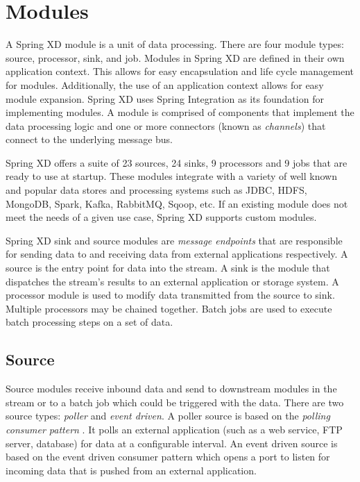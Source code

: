 \section{Modules}
\label{sec:Modules}
A Spring XD module is a unit of data processing. There are four module
types: source, processor, sink, and job. Modules in Spring XD are defined
in their own application context. This allows for easy encapsulation and life cycle
management for modules. Additionally, the use of an application context allows for easy
module expansion.  Spring XD uses Spring Integration as its foundation for
implementing modules. A module is comprised of components that
implement the data processing logic and one or more connectors (known as \emph{channels})
that connect to the underlying message bus.

\par

Spring XD offers a suite of 23 sources, 24 sinks, 9 processors and 9 jobs that are ready
to use at startup.  These modules integrate with a variety of well known and popular
data stores and processing systems such as JDBC\cite{jdbc}, HDFS, MongoDB\cite{mongodb},
Spark, Kafka, RabbitMQ, Sqoop, etc.  If an existing module does not meet the needs of a
given use case, Spring XD supports custom modules.

Spring XD sink and source modules are \emph{message endpoints}
\cite{enterprise-integration-pattern-message-endpoint}
that are responsible for sending data to and receiving data from external applications
respectively. A source is the entry point for data into the stream. A sink is
the module that dispatches the stream's results to an external application or storage system.
A processor module is used to modify data transmitted from the source to sink.
Multiple processors may be chained together. Batch jobs are used to execute batch
processing steps on a set of data.

\par

\subsection{Source}
\label{sec:Source}
Source modules receive inbound data and send to downstream modules in the stream or to a batch job
which could be triggered with the data. There are two source types: \emph{poller} and \emph{event driven}.
A poller source is based on the \emph{polling consumer pattern}
\cite{enterprise-integration-pattern-pollingconsumer}.
It polls an external application (such as a web service, FTP server, database) for data at a
configurable interval. An event driven source is based on the event driven
consumer pattern \cite{enterprise-integration-pattern-eventdrivenconsumer} which
opens a port to listen for incoming data that is pushed from an external application.

